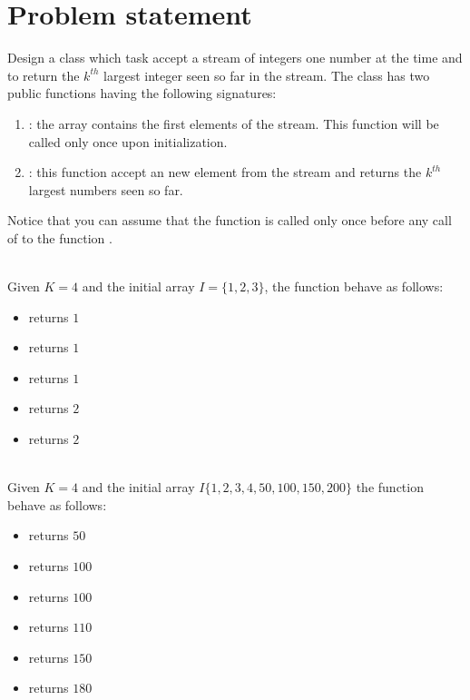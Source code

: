 \section{Problem statement}
\begin{exercise}
	Design a class which task accept a stream of integers one number at the time and to return the
	$k^{th}$ largest integer seen so far in the stream. The class has two public functions having
	the following signatures:
	\begin{enumerate}
		\item {}: the array
		 contains the first elements of the stream. This function will be called only once
		upon initialization.
		\item  {}: this function accept an new element from the stream and
		returns the $k^{th}$ largest numbers seen so far. 
	\end{enumerate}
Notice that you can assume that the function  is called only once before any call of to the function .

\begin{example}
	\hfill \\
	Given $K=4$ and the initial array $I=\{1,2,3\}$, the function  behave as
	follows:
	\begin{itemize}
		\item {} returns $1$
		\item {} returns $1$
		\item {} returns $1$
		\item {} returns $2$
		\item {} returns $2$
	\end{itemize}
\end{example}

\begin{example}
	\hfill \\
	Given $K=4$ and the initial array $I\{1,2,3,4,50,100,150,200\}$ the function  behave as follows:
	\begin{itemize}
		\item {} returns $50$
		\item {} returns $100$
		\item {} returns $100$
		\item {} returns $110$
		\item {} returns $150$
		\item {} returns $180$
	\end{itemize} 
	\label{ex:kthlargest_in_stream:example2} 
\end{example}

\end{exercise}

